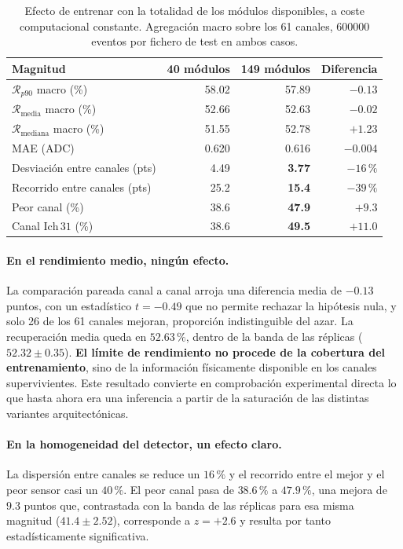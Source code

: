 \begin{table}[htbp]
\centering
\caption{Efecto de entrenar con la totalidad de los módulos disponibles, a coste computacional
constante. Agregación macro sobre los 61 canales, \num{600000} eventos por fichero de test en ambos
casos.}
\label{tab:res-cobertura}
\small
\begin{tabular}{lrrr}
\toprule
\textbf{Magnitud} & \textbf{40 módulos} & \textbf{149 módulos} & \textbf{Diferencia} \\
\midrule
$\mathcal{R}_{p90}$ macro (\%) & 58.02 & 57.89 & $-0.13$ \\
$\mathcal{R}_{\text{media}}$ macro (\%) & 52.66 & 52.63 & $-0.02$ \\
$\mathcal{R}_{\text{mediana}}$ macro (\%) & 51.55 & 52.78 & $+1.23$ \\
MAE (ADC) & 0.620 & 0.616 & $-0.004$ \\
\midrule
Desviación entre canales (pts) & 4.49 & \textbf{3.77} & $-16\,\%$ \\
Recorrido entre canales (pts) & 25.2 & \textbf{15.4} & $-39\,\%$ \\
Peor canal (\%) & 38.6 & \textbf{47.9} & $\mathbf{+9.3}$ \\
Canal $\mathrm{Ich}\,31$ (\%) & 38.6 & \textbf{49.5} & $\mathbf{+11.0}$ \\
\bottomrule
\end{tabular}
\end{table}

\paragraph{En el rendimiento medio, ningún efecto.} La comparación pareada canal a canal arroja una
diferencia media de $-0.13$ puntos, con un estadístico $t = -0.49$ que no permite rechazar la
hipótesis nula, y solo 26 de los 61 canales mejoran, proporción indistinguible del azar. La
recuperación media queda en $52.63\,\%$, dentro de la banda de las réplicas
($52.32 \pm 0.35$). \textbf{El límite de rendimiento no procede de la cobertura del entrenamiento},
sino de la información físicamente disponible en los canales supervivientes. Este resultado
convierte en comprobación experimental directa lo que hasta ahora era una inferencia a partir de la
saturación de las distintas variantes arquitectónicas.

\paragraph{En la homogeneidad del detector, un efecto claro.} La dispersión entre canales se reduce
un $16\,\%$ y el recorrido entre el mejor y el peor sensor casi un $40\,\%$. El peor canal pasa de
$38.6\,\%$ a $47.9\,\%$, una mejora de $9.3$ puntos que, contrastada con la banda de las réplicas
para esa misma magnitud ($41.4 \pm 2.52$), corresponde a $z = +2.6$ y resulta por tanto
estadísticamente significativa.

